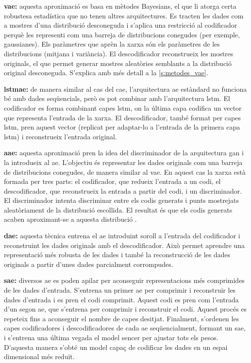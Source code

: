 \documentclass[CAT,BIB]{TFUOC}%
\begin{document}
        \textbf{\Gls{vae}:} aquesta aproximació es basa en mètodes Bayesians, el que li atorga certa robustesa estadística que no tenen altres arquitectures. Es tracten les dades com a mostres d'una distribució desconeguda i s'aplica una restricció al codificador perquè les representi com una barreja de distribucions conegudes (per exemple, gaussianes). Els paràmetres que aprèn la xarxa són els paràmetres de les distribucions (mitjana i variància). El descodificador reconstrueix les mostres originals, el que permet generar mostres aleatòries semblants a la distribució original desconeguda. S'explica amb més detall a la \cref{s:metodes_vae}.

        \textbf{\Gls{lstmae}:} de manera similar al cas del \gls{cae}, l'arquitectura \gls{ae} estàndard no funciona bé amb dades seqüencials, però es pot combinar amb l'arquitectura \gls{lstm}. El codificador es forma combinant capes \gls{lstm}, on la última capa codifica un vector que representa l'entrada de la xarxa. El descodificador, també format per capes \gls{lstm}, pren aquest vector (replicat per adaptar-lo a l'entrada de la primera capa \gls{lstm}) i reconstrueix l'entrada original.

        \textbf{\Gls{aae}:} aquesta aproximació pren la idea del discriminador de la arquitectura \gls{gan} i la introdueix al \gls{ae}. L'objectiu és representar les dades originals com una barreja de distribucions conegudes, de manera similar al \gls{vae}. En aquest cas la xarxa està formada per tres parts: el codificador, que redueix l'entrada a un codi, el descodificador, que reconstrueix la entrada a partir del codi, i un discriminador. El discriminador intenta discriminar entre els codis generats i punts mostrejats aleatòriament de la distribució escollida. El resultat és que els codis generats acaben aproximant-se a aquesta distribució \citep{Makhzani2015}.

        \textbf{\Gls{dae}:} aquesta tècnica entrena el \gls{ae} introduint soroll a l'entrada del codificador i reconstruint les dades originals amb el descodificador. Això permet aprendre una representació més robusta de les dades i també la reconstrucció de les dades originals a partir d'unes dades parcialment corrompudes.

        \textbf{\Gls{sae}:} diversos \gls{ae} es poden apilar per aconseguir representacions més comprimides de les dades d'entrada. S'entrena un primer \gls{ae} per comprimir i reconstruir les dades d'entrada i es pren el codi comprimit. Aquest codi es pren com l'entrada d'un segon \gls{ae}, que s'entrena per comprimir i reconstruir el codi. Aquest procés es repeteix fins a aconseguir el nombre de capes desitjat. Finalment, s'ordenen les capes codificadores i descodificadores de cada \gls{ae} seqüencialment, formant un \gls{sae}, i s'entrena una última vegada el model sencer per ajustar tots els pesos. D'aquesta manera s'obté un model capaç de codificar les dades en un espai dimensional més reduït.
\end{document}
